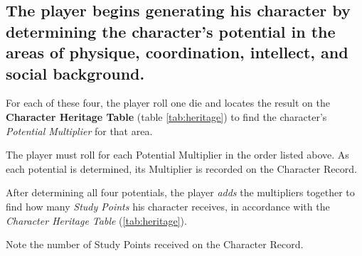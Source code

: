 \subsection[Potentials]{The player begins generating his character by
  determining the character's potential in the areas of physique,
  coordination, intellect, and social background.}
\label{sec:potentials}

For each of these four, the player roll one die and locates the result
on the \textbf{Character Heritage Table} (table \vref{tab:heritage})
to find the character's \emph{Potential Multiplier} for that area.

The player must roll for each Potential Multiplier in the order listed
above. As each potential is determined, its Multiplier is recorded on
the Character Record.

After determining all four potentials, the player \emph{adds} the
multipliers together to find how many \emph{Study Points} his
character receives, in accordance with the \emph{Character Heritage
  Table} (\vref{tab:heritage}).

Note the number of Study Points received on the Character Record.

\begin{table}[htbp]
  \centering
  \end{table}

